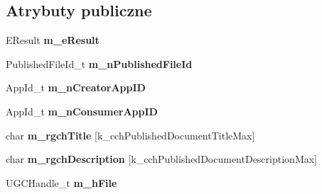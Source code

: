 \subsection*{Atrybuty publiczne}
\begin{DoxyCompactItemize}
\item 
\mbox{\label{struct_remote_storage_get_published_file_details_result__t_affc5234f994daa21b7e218ff6cf84e34}} 
E\+Result {\bfseries m\+\_\+e\+Result}
\item 
\mbox{\label{struct_remote_storage_get_published_file_details_result__t_a1bdabfa0ee6423e6c53f0580476c35f7}} 
Published\+File\+Id\+\_\+t {\bfseries m\+\_\+n\+Published\+File\+Id}
\item 
\mbox{\label{struct_remote_storage_get_published_file_details_result__t_a7b3d6dbbac07a7452412c802a0700d85}} 
App\+Id\+\_\+t {\bfseries m\+\_\+n\+Creator\+App\+ID}
\item 
\mbox{\label{struct_remote_storage_get_published_file_details_result__t_a6e90dcf7ad86083176d0d1262a403866}} 
App\+Id\+\_\+t {\bfseries m\+\_\+n\+Consumer\+App\+ID}
\item 
\mbox{\label{struct_remote_storage_get_published_file_details_result__t_a3c58f292bb703f06f3071c9ce2bfbfa9}} 
char {\bfseries m\+\_\+rgch\+Title} \mbox{[}k\+\_\+cch\+Published\+Document\+Title\+Max\mbox{]}
\item 
\mbox{\label{struct_remote_storage_get_published_file_details_result__t_a85798fbc2e71d461da7488bb7fdc9561}} 
char {\bfseries m\+\_\+rgch\+Description} \mbox{[}k\+\_\+cch\+Published\+Document\+Description\+Max\mbox{]}
\item 
\mbox{\label{struct_remote_storage_get_published_file_details_result__t_a71b8f6368768e9fe4992fe8cf810db18}} 
U\+G\+C\+Handle\+\_\+t {\bfseries m\+\_\+h\+File}
\item 

\end{DoxyCompactItemize}

